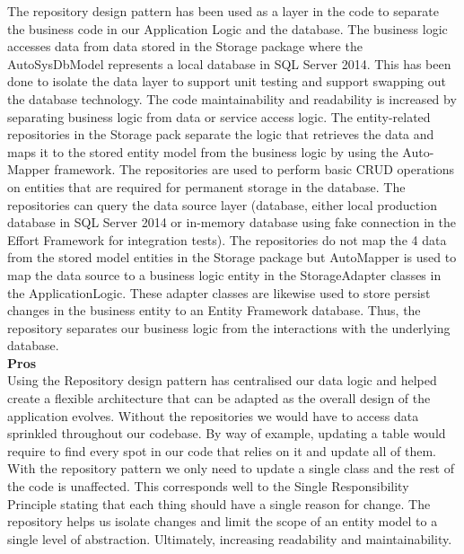 The repository design pattern has been used as a layer in the code to separate
the business code in our Application Logic and the database. The business
logic accesses data from data stored in the Storage package where the AutoSysDbModel
represents a local database in SQL Server 2014. This has been done
to isolate the data layer to support unit testing and support swapping out the
database technology. The code maintainability and readability is increased by
separating business logic from data or service access logic. The entity-related
repositories in the Storage pack separate the logic that retrieves the data and
maps it to the stored entity model from the business logic by using the Auto-
Mapper framework. The repositories are used to perform basic CRUD operations
on entities that are required for permanent storage in the database. The
repositories can query the data source layer (database, either local production
database in SQL Server 2014 or in-memory database using fake connection in
the Effort Framework for integration tests). The repositories do not map the
4
data from the stored model entities in the Storage package but AutoMapper
is used to map the data source to a business logic entity in the StorageAdapter
classes in the ApplicationLogic. These adapter classes are likewise used to
store persist changes in the business entity to an Entity Framework database.
Thus, the repository separates our business logic from the interactions with the
underlying database.\\

\textbf{Pros}\\
Using the Repository design pattern has centralised our data logic and helped
create a flexible architecture that can be adapted as the overall design of
the application evolves. Without the repositories we would have to access data
sprinkled throughout our codebase. By way of example, updating a table would
require to find every spot in our code that relies on it and update all of them.
With the repository pattern we only need to update a single class and the rest
of the code is unaffected. This corresponds well to the Single Responsibility
Principle stating that each thing should have a single reason for change. The
repository helps us isolate changes and limit the scope of an entity model to a
single level of abstraction. Ultimately, increasing readability and maintainability.\\

